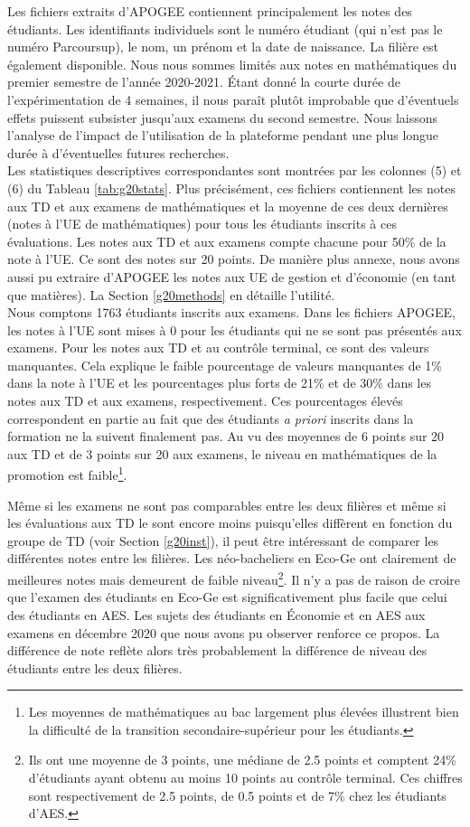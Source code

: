 \documentclass[
]{book}
\begin{document}
\quad Les fichiers extraits d'APOGEE contiennent principalement les notes des étudiants. Les identifiants individuels sont le numéro étudiant (qui n'est pas le numéro Parcoursup), le nom, un prénom et la date de naissance. La filière est également disponible. Nous nous sommes limités aux notes en mathématiques du premier semestre de l'année 2020-2021. Étant donné la courte durée de l'expérimentation de 4 semaines, il nous paraît plutôt improbable que d'éventuels effets puissent subsister jusqu'aux examens du second semestre. Nous laissons l'analyse de l'impact de l'utilisation de la plateforme pendant une plus longue durée à d'éventuelles futures recherches.\\
Les statistiques descriptives correspondantes sont montrées par les colonnes (5) et (6) du Tableau \ref{tab:g20stats}. Plus précisément, ces fichiers contiennent les notes aux TD et aux examens de mathématiques et la moyenne de ces deux dernières (notes à l'UE de mathématiques) pour tous les étudiants inscrits à ces évaluations. Les notes aux TD et aux examens compte chacune pour 50\% de la note à l'UE. Ce sont des notes sur 20 points. De manière plus annexe, nous avons aussi pu extraire d'APOGEE les notes aux UE de gestion et d'économie (en tant que matières). La Section \ref{g20methods} en détaille l'utilité.\\
Nous comptons 1763 étudiants inscrits aux examens.
Dans les fichiers APOGEE, les notes à l'UE sont mises à 0 pour les étudiants qui ne se sont pas présentés aux examens. Pour les notes aux TD et au contrôle terminal, ce sont des valeurs manquantes. Cela explique le faible pourcentage de valeurs manquantes de 1\% dans la note à l'UE et les pourcentages plus forts de 21\% et de 30\% dans les notes aux TD et aux examens, respectivement. Ces pourcentages élevés correspondent en partie au fait que des étudiants \emph{a priori} inscrits dans la formation ne la suivent finalement pas.
Au vu des moyennes de 6 points sur 20 aux TD et de 3 points sur 20 aux examens, le niveau en mathématiques de la promotion est faible\footnote{Les moyennes de mathématiques au bac largement plus élevées illustrent bien la difficulté de la transition secondaire-supérieur pour les étudiants.}.

Même si les examens ne sont pas comparables entre les deux filières et même si les évaluations aux TD le sont encore moins puisqu'elles diffèrent en fonction du groupe de TD (voir Section \ref{g20inst}), il peut être intéressant de comparer les différentes notes entre les filières.
Les néo-bacheliers en Eco-Ge ont clairement de meilleures notes mais demeurent de faible niveau\footnote{Ils ont une moyenne de 3 points, une médiane de 2.5 points et comptent 24\% d'étudiants ayant obtenu au moins 10 points au contrôle terminal. Ces chiffres sont respectivement de 2.5 points, de 0.5 points et de 7\% chez les étudiants d'AES.}. Il n'y a pas de raison de croire que l'examen des étudiants en Eco-Ge est significativement plus facile que celui des étudiants en AES. Les sujets des étudiants en Économie et en AES aux examens en décembre 2020 que nous avons pu observer renforce ce propos. La différence de note reflète alors très probablement la différence de niveau des étudiants entre les deux filières.
\end{document}
